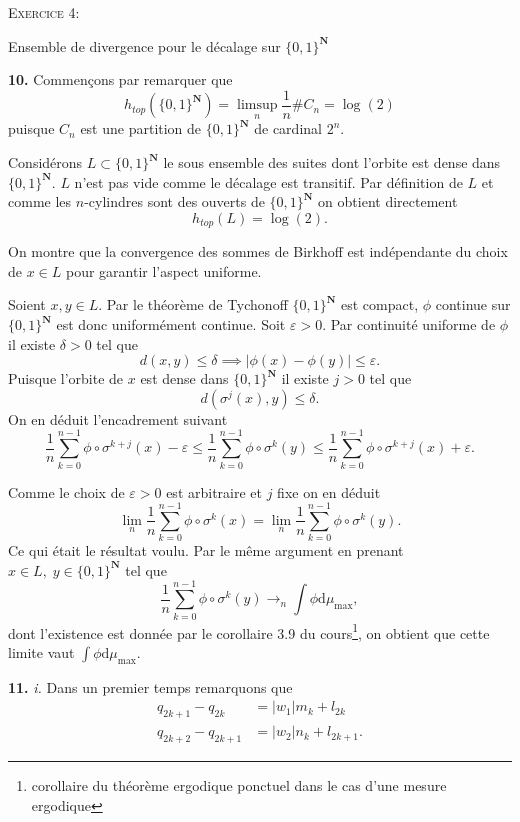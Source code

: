\documentclass[12pt]{article}
\newenvironment{ex}[1]
{\begin{mdframed}[linewidth=0.6pt]
        \textsc{Exercice #1:}

}
    {\end{mdframed}}
\newcommand{\N}{\mathbf{N}}
\newcommand{\de}{\mathrm{d}}
\begin{document}
\bigskip

\begin{ex}{4}
       Ensemble de divergence pour le décalage sur $\{0,1\}^{\N}$ 
\end{ex}

\textbf{10.} Commençons par remarquer que \[
        h_{top}(\{0,1\}^{\N}) = \limsup_{n}\frac{1}{n}\#C_{n} = \log(2)
\] puisque $C_{n}$ est une partition de $\{0,1\}^{\N}$ de cardinal $2^{n}$. 

Considérons $L \subset \{0,1\}^{\N}$ le sous ensemble des suites dont l'orbite est dense dans $\{0,1\}^{\N}$. $L$ n'est pas vide comme le décalage est transitif. Par définition de $L$ et comme les $n$-cylindres sont des ouverts de $\{0,1\}^{\N}$ on obtient directement \[
        h_{top}(L) = \log(2)
.\] 

On montre que la convergence des sommes de Birkhoff est indépendante du choix de $x \in L$ pour garantir l'aspect uniforme.

Soient $x, y \in L$. Par le théorème de Tychonoff $\{0,1\}^{\N}$ est compact, $\phi$ continue sur $\{0,1\}^{\N}$ est donc uniformément continue.
Soit $\varepsilon > 0$. Par continuité uniforme de $\phi$ il existe  $\delta > 0$ tel que  \[
        d(x,y) \le \delta \implies |\phi(x)-\phi(y)| \le \varepsilon
.\] Puisque l'orbite de $x$ est dense dans $\{0,1\}^{\N}$ il existe $j > 0$ tel que \[
d(\sigma^{j}(x), y) \le \delta
.\] 
On en déduit l'encadrement suivant \[
        \frac{1}{n}\sum_{k=0}^{n-1} \phi\circ\sigma^{k+j}(x) - \varepsilon \le \frac{1}{n}\sum_{k=0}^{n-1} \phi\circ\sigma^{k}(y) \le \frac{1}{n}\sum_{k=0}^{n-1} \phi\circ\sigma^{k+j}(x) + \varepsilon 
.\] 

Comme le choix de $\varepsilon > 0$ est arbitraire et $j$ fixe on en déduit  \[
\lim_{n}\frac{1}{n}\sum_{k=0}^{n-1} \phi\circ\sigma^{k}(x) =  \lim_{n}\frac{1}{n}\sum_{k=0}^{n-1} \phi\circ\sigma^{k}(y)
.\] Ce qui était le résultat voulu. Par le même argument en prenant $x \in L, \; y \in \{0,1\}^{\N}$ tel que \[
\frac{1}{n}\sum_{k=0}^{n-1} \phi\circ\sigma^{k}(y) \to_{n}\int\phi\de\mu_{\max}
,\] dont l'existence est donnée par le corollaire 3.9 du cours\footnote{corollaire du théorème ergodique ponctuel dans le cas d'une mesure ergodique}, on obtient que cette limite vaut $\int\phi\de\mu_{\max}$.

\medskip

\textbf{11.} \textit{i.} Dans un premier temps remarquons que
\begin{align*}
        q_{2k+1}-q_{2k} &= |w_{1}|m_{k}+l_{2k} \\
        q_{2k+2}-q_{2k+1} &= |w_{2}|n_{k}+l_{2k+1}
.\end{align*}
\end{document}
